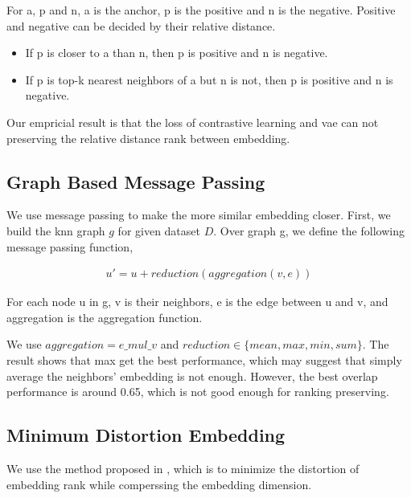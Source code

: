 \documentclass{ol-softwaremanual}
\begin{document}
For a, p and n, a is the anchor, p is the positive and n is the negative. Positive and negative can be decided by their relative distance.
\begin{itemize}
    \item If p is closer to a than n, then p is positive and n is negative.
    \item If p is top-k nearest neighbors of a but n is not, then p is positive and n is negative.
\end{itemize}

Our empricial result is that the loss of contrastive learning and vae can not preserving the relative distance rank between embedding. 

\subsection{Graph Based Message Passing}
We use message passing to make the more similar embedding closer. First, we build the knn graph $g$ for given dataset $D$. Over graph g, we define the following message passing function, 

\begin{align}
    u' = u + reduction(aggregation(v, e))
\end{align}

For each node u in g, v is their neighbors, e is the edge between u and v, and aggregation is the aggregation function.

We use $aggregation=e\_mul\_v$ and $reduction\in\{mean,max,min,sum\}$. The result shows that max get the best performance, which may suggest that simply average the neighbors' embedding is not enough. However, the best overlap performance is around 0.65, which is not good enough for ranking preserving.

\subsection{Minimum Distortion Embedding}
We use the method proposed in \cite{agrawal__MinimumDistortionEmbedding}, which is to minimize the distortion of embedding rank while comperssing the embedding dimension. 




% 




\end{document}
